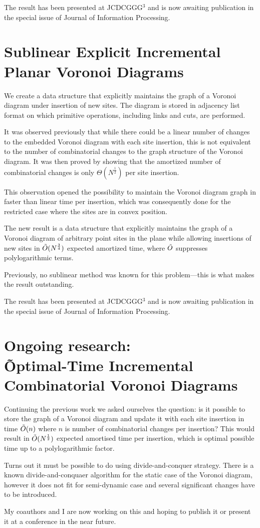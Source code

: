 \documentclass[a4paper,11pt]{article}
\theoremstyle{definition}
\begin{document}
The result has been presented at JCDCGGG$^3$ and is now awaiting publication in the special issue of Journal of Information Processing.

\section{Sublinear Explicit Incremental Planar Voronoi Diagrams}

We create a data structure that explicitly maintains the graph of a Voronoi diagram under insertion of new sites. The diagram is stored in adjacency list format on which primitive operations, including links and cuts, are performed.

It was observed previously that while there could be a linear number of changes to the embedded Voronoi diagram with each site insertion, this is not equivalent to the number of combinatorial changes to the graph structure of the Voronoi diagram.
It was then proved by showing that the amortized number of combinatorial changes is only $\Theta(N^{\frac 12})$ per site insertion.

This observation opened the possibility to maintain the Voronoi diagram graph in faster than linear time per insertion, which was consequently done for the restricted case where the sites are in convex position.

The new result is a data structure that explicitly maintains the graph of a Voronoi diagram of arbitrary point sites in the plane while allowing insertions of new sites in $\tilde O (N^{\frac 34})$ expected amortized time, where $\tilde O$ suppresses polylogarithmic terms. 

Previously, no sublinear method was known for this problem—this is what makes the result outstanding.

The result has been presented at JCDCGGG$^3$ and is now awaiting publication in the special issue of Journal of Information Processing.

\section{Ongoing research: \\
	\~Optimal-Time Incremental Combinatorial Voronoi Diagrams}

Continuing the previous work we asked ourselves the question: is it possible to store the graph of a Voronoi diagram and update it with each site insertion in time $\tilde O(n)$ where $n$ is number of combinatorial changes per insertion? This would result in $\tilde O(N^\frac12)$ expected amortised time per insertion, which is optimal possible time up to a polylogarithmic factor.

Turns out it must be possible to do using divide-and-conquer strategy. There is a known divide-and-conquaer algorithm for the static case of the Voronoi diagram, however it does not fit for semi-dynamic case and several significant changes have to be introduced.

My coauthors and I are now working on this and hoping to publish it or present it at a conference in the near future.
\end{document}
